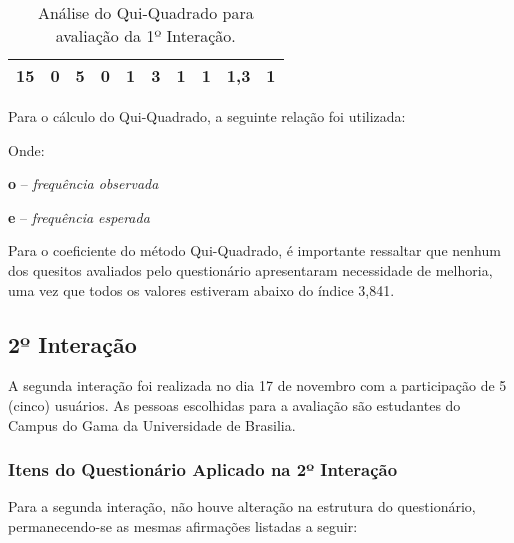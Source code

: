 \begin{landscape}
\begin{table}[h]
\begin{tabular}{|c|c|c|c|c|c|c|c|c|c|}
						15 & 0 & 5 & 0 & 1 & 3 & 1 & 1 & 1,3 & 1 \\

						\hline

					\end{tabular}
					\caption[Análise do Qui-Quadrado para avaliação da 1º Interação]{Análise do Qui-Quadrado para avaliação da 1º Interação.}
					\label{tab:terceiraAvaliacao2_tables}
				\end{table}

				\begin{flushleft}
				Para o cálculo do Qui-Quadrado, a seguinte relação foi utilizada:

				Onde:
				
				\textbf{o} – \emph{frequência observada}

				\textbf{e} – \emph{frequência esperada}

				Para o coeficiente do método Qui-Quadrado, é importante ressaltar que nenhum dos quesitos avaliados pelo questionário apresentaram necessidade de melhoria, uma vez que todos os valores estiveram abaixo do índice 3,841.
				\end{flushleft}
				\end{landscape}


		\subsection[2º Interação]{2º Interação}
		\label{sec:terceiraAvaliacao_2}

			A segunda interação foi realizada no dia 17 de novembro com a participação de 5 (cinco) usuários. As pessoas escolhidas para a avaliação são estudantes do Campus do Gama da Universidade de Brasilia.

			\subsubsection[Itens do Questionário Aplicados na 2º Interação]{Itens do Questionário Aplicado na 2º Interação}
			\label{sec:terceiraAvaliacao_2_Questionario}

				Para a segunda interação, não houve alteração na estrutura do questionário, permanecendo-se as mesmas afirmações listadas a seguir:

